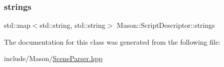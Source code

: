 \hypertarget{class_mason_1_1_script_descriptor_a426d001b44ece88ba6b465b0505724c4}{}\label{class_mason_1_1_script_descriptor_a426d001b44ece88ba6b465b0505724c4} 
\subsubsection{\texorpdfstring{strings}{strings}}
{\footnotesize\ttfamily std\+::map$<$std\+::string, std\+::string$>$ Mason\+::\+Script\+Descriptor\+::strings}



The documentation for this class was generated from the following file\+:\begin{DoxyCompactItemize}
\item 
include/\+Mason/\hyperlink{_scene_parser_8hpp}{Scene\+Parser.\+hpp}\end{DoxyCompactItemize}
